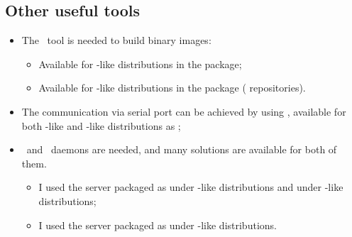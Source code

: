 \subsection{ Other useful tools } \label{sub:OtherTools}

    \begin{itemize}

    \item  The \mkimage\ tool is needed to build binary images:

        \begin{itemize}
        \item   Available for \Debian-like distributions in the
                 package;
        \item   Available for \RedHat-like distributions in the
                 package (
                repositories).
        \end{itemize}

    \item   The communication via serial port can be achieved by using
            \Minicom, available for both \Debian-like and \RedHat-like
            distributions as ;

    \item   \BootP\ and \TFTP\ daemons are needed, and many solutions are
            available for both of them.
            \begin{itemize}
            \item   I used the server packaged as 
                    under \Debian-like distributions and
                     under \RedHat-like
                    distributions;
            \item   I used the server packaged as 
                    under \Debian-like distributions.
            \end{itemize}

    \end{itemize}

